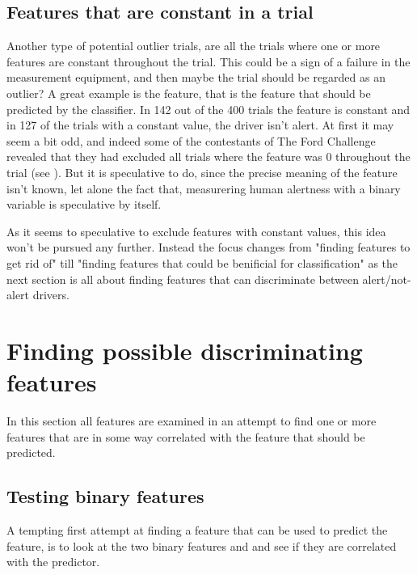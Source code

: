 \subsection{Features that are constant in a trial}
Another type of potential outlier trials, are all the trials where one or more features are constant throughout the trial. This could be a sign of a failure in the measurement equipment, and then maybe the trial should be regarded as an outlier? A great example is the  feature, that is the feature that should be predicted by the classifier. In 142 out of the 400 trials the  feature is constant and in 127 of the trials with a constant value, the driver isn't alert. At first it may seem a bit odd, and indeed some of the contestants of The Ford Challenge revealed that they had excluded all trials where the  feature was 0 throughout the trial (see \citet{kaggle_forum_328_reply_2}). But it is speculative to do, since the precise meaning of the  feature isn't known, let alone the fact that, measurering human alertness with a binary variable is speculative by itself. \par
As it seems to speculative to exclude features with constant values, this idea won't be pursued any further. Instead the focus changes from "finding features to get rid of" till "finding features that could be benificial for classification" as the next section is all about finding features that can discriminate between alert/not-alert drivers.


\section{Finding possible discriminating features}
In this section all features are examined in an attempt to find one or more features that are in some way correlated with the  feature that should be predicted. 

\subsection{Testing binary features}
A tempting first attempt at finding a feature that can be used to predict the  feature, is to look at the two binary features  and  and see if they are correlated with the predictor.

